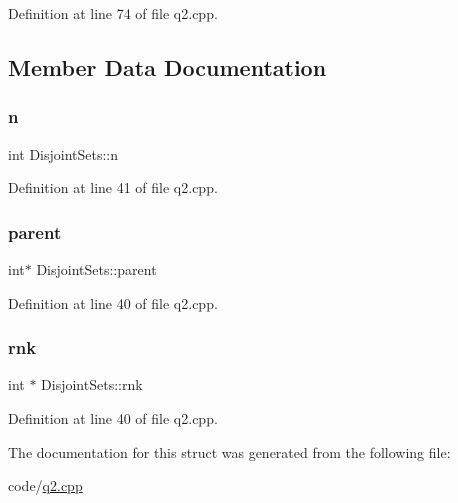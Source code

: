 Definition at line 74 of file q2.\+cpp.



\subsection{Member Data Documentation}
\mbox{\label{struct_disjoint_sets_aeb43c9e003e2bd5b83b5c60d56dfd23e}} 
\subsubsection{\texorpdfstring{n}{n}}
{\footnotesize\ttfamily int Disjoint\+Sets\+::n}



Definition at line 41 of file q2.\+cpp.

\mbox{\label{struct_disjoint_sets_ad7f9caf9365a04a1c6670aa372a3cdbd}} 
\subsubsection{\texorpdfstring{parent}{parent}}
{\footnotesize\ttfamily int$\ast$ Disjoint\+Sets\+::parent}



Definition at line 40 of file q2.\+cpp.

\mbox{\label{struct_disjoint_sets_a93f26d80d2fb349bd97793fb41e502e8}} 
\subsubsection{\texorpdfstring{rnk}{rnk}}
{\footnotesize\ttfamily int $\ast$ Disjoint\+Sets\+::rnk}



Definition at line 40 of file q2.\+cpp.



The documentation for this struct was generated from the following file\+:\begin{DoxyCompactItemize}
\item 
code/\hyperlink{q2_8cpp}{q2.\+cpp}\end{DoxyCompactItemize}
